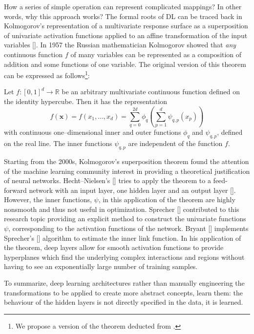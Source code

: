 How a series of simple operation can represent complicated mappings? In other words, why this approach works? The formal roots of DL can be traced back in Kolmogorov's representation of a multivariate response surface as a superposition of univariate activation functions applied to an affine transformation of the input variables [\cite{Kolmogorov1957}]. In 1957 the Russian mathematician Kolmogorov showed that \textit{any} continuous function $f$ of many variables can be represented as a composition of addition and
some functions of one variable. The original version of this theorem can be expressed as follows\footnote{We propose a version of the theorem deducted from \cite{Kolmogorov2009, Kolmogorov2011}.}:
\begin{theorem}
    Let $f: [0, 1]^{d} \rightarrow \mathbb{R}$ be an arbitrary multivariate continuous function defined on the identity hypercube. Then it
has the representation 
$$f(\mathbf{x}) = f(x_1, \dots, x_d) = \sum_{q=0}^{2d} \phi_q \left(\sum_{p=1}^{d} \psi_{q,p} (x_p) \right)$$
with continuous one–dimensional inner and outer functions $\phi_q$ and $\psi_{q,p}$, defined on the real line. The inner functions $\psi_{q,p}$ are independent of the function $f$.
\end{theorem}
Starting from the 2000s, Kolmogorov’s superposition theorem found the attention of the machine learning community interest in providing a theoretical justification of neural networks. Hecht–Nielsen’s [\cite{Kolmogorov2011}] tries to apply the theorem to a feed-forward network with an input layer, one hidden layer and an output layer [\cite{Kolmogorov1987}]. However, the inner functions, $\psi$, in this application of the theorem are highly nonsmooth and thus not useful in optimization. Sprecher [\cite{Kolmogorov1965}] contributed to this research topic providing an explicit method to construct the univariate functions $\psi$, corresponding to the activation functions of the network. Bryant [\cite{Bryant2008}] implements Sprecher's [\cite{Kolmogorov1972}] algorithm to estimate the inner link function. In his application of the theorem, deep layers allow for smooth activation functions to provide  hyperplanes which find the underlying complex interactions and regions without having to see an exponentially large number of training samples.

To summarize, deep learning architectures rather than manually engineering the transformations to be applied to create more abstract concepts, learn them: the behaviour of the hidden layers is not directly specified in the data, it is learned. 











